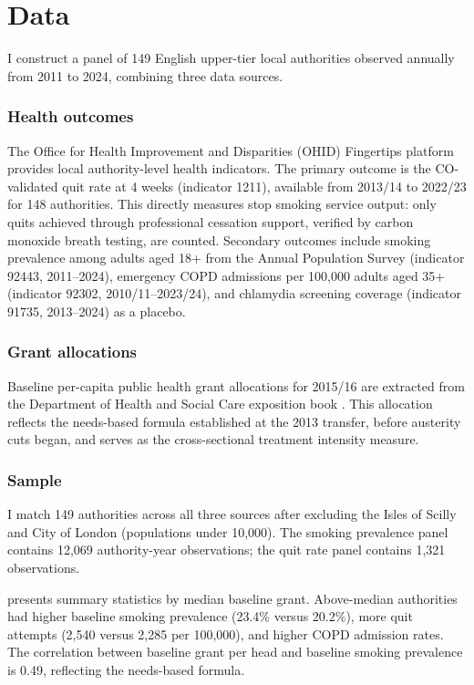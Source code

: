 \documentclass[12pt]{article}
\begin{document}
\section{Data}

I construct a panel of 149 English upper-tier local authorities observed annually from 2011 to 2024, combining three data sources.

\subsubsection*{Health outcomes} The Office for Health Improvement and Disparities (OHID) Fingertips platform provides local authority-level health indicators. The primary outcome is the CO-validated quit rate at 4 weeks (indicator 1211), available from 2013/14 to 2022/23 for 148 authorities. This directly measures stop smoking service output: only quits achieved through professional cessation support, verified by carbon monoxide breath testing, are counted. Secondary outcomes include smoking prevalence among adults aged 18+ from the Annual Population Survey (indicator 92443, 2011--2024), emergency COPD admissions per 100,000 adults aged 35+ (indicator 92302, 2010/11--2023/24), and chlamydia screening coverage (indicator 91735, 2013--2024) as a placebo.

\subsubsection*{Grant allocations} Baseline per-capita public health grant allocations for 2015/16 are extracted from the Department of Health and Social Care exposition book \citep{dhsc2016allocations}. This allocation reflects the needs-based formula established at the 2013 transfer, before austerity cuts began, and serves as the cross-sectional treatment intensity measure.

\subsubsection*{Sample} I match 149 authorities across all three sources after excluding the Isles of Scilly and City of London (populations under 10,000). The smoking prevalence panel contains 12,069 authority-year observations; the quit rate panel contains 1,321 observations.

 presents summary statistics by median baseline grant. Above-median authorities had higher baseline smoking prevalence (23.4\% versus 20.2\%), more quit attempts (2,540 versus 2,285 per 100,000), and higher COPD admission rates. The correlation between baseline grant per head and baseline smoking prevalence is 0.49, reflecting the needs-based formula.
\end{document}
